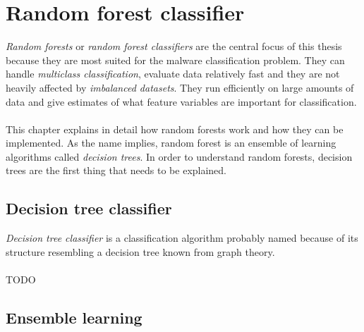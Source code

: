 \documentclass[11pt]{article}
\begin{document}
  \section{Random forest classifier}
    {\it Random forests} or {\it random forest classifiers} are the central focus of this thesis because they are most suited for the malware classification problem. They can handle {\it multiclass classification}, evaluate data relatively fast and they are not heavily affected by {\it imbalanced datasets}. \citep{brabec} They run efficiently on large amounts of data and give estimates of what feature variables are important for classification. \citep{breiman}
    \\~\\
    This chapter explains in detail how random forests work and how they can be implemented. As the name implies, random forest is an ensemble of learning algorithms called {\it decision trees}. In order to understand random forests, decision trees are the first thing that needs to be explained.
    \subsection{Decision tree classifier}
      {\it Decision tree classifier} is a classification algorithm probably named because of its structure resembling a decision tree known from graph theory.
      \\~\\
      {\color{red}TODO}
    \subsection{Ensemble learning}
  \newpage
\end{document}
